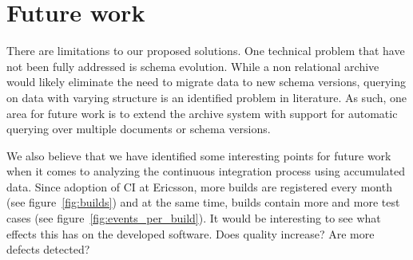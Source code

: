 
\section{Future work}
There are limitations to our proposed solutions. One technical problem that have not been fully addressed is schema evolution. While a non relational archive would likely eliminate the need to migrate data to new schema versions, querying on data with varying structure is an identified problem in literature. As such, one area for future work is to extend the archive system with support for automatic querying over multiple documents or schema versions. 

We also believe that we have identified some interesting points for future work when it comes to analyzing the continuous integration process using accumulated data. Since adoption of CI at Ericsson, more builds are registered every month (see figure~\ref{fig:builds}) and at the same time, builds contain more and more test cases (see figure~\ref{fig:events_per_build}). It would be interesting to see what effects this has on the developed software. Does quality increase? Are more defects detected? 

